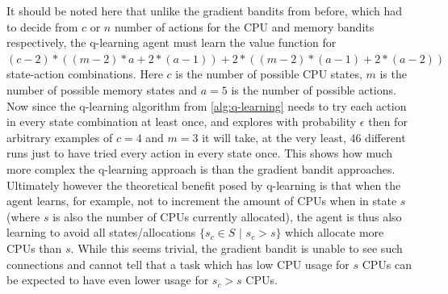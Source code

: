 It should be noted here that unlike the gradient bandits from before, which had to decide from $c$ or $n$ number of actions for the CPU and memory bandits respectively, the q-learning agent must learn the value function for $(c-2)*((m-2)*a + 2*(a-1)) + 2*((m-2)*(a-1) + 2*(a-2))$ state-action combinations. Here $c$ is the number of possible CPU states, $m$ is the number of possible memory states and $a=5$ is the number of possible actions. Now since the q-learning algorithm from \ref{alg:q-learning} needs to try each action in every state combination at least once, and explores with probability $\epsilon$ then for arbitrary examples of $c=4$ and $m=3$ it will take, at the very least, 46 different runs just to have tried every action in every state once. This shows how much more complex the q-learning approach is than the gradient bandit approaches. Ultimately however the theoretical benefit posed by q-learning is that when the agent learns, for example, not to increment the amount of CPUs when in state $s$ (where $s$ is also the number of CPUs currently allocated), the agent is thus also learning to avoid all states/allocations $\{s_c \in S$ $|$ $s_c > s\}$ which allocate more CPUs than $s$. While this seems trivial, the gradient bandit is unable to see such connections and cannot tell that a task which has low CPU usage for $s$ CPUs can be expected to have even lower usage for $s_c > s$ CPUs. 


